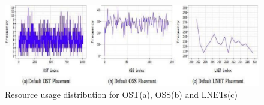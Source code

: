 \begin{figure}[tbh]
  \centering
  \includegraphics[width=\columnwidth]{graphics/infrastructure.pdf}
  \caption{Resource usage distribution for OST(a), OSS(b) and LNETs(c) }
\end{figure}
\vskip-0.2in







